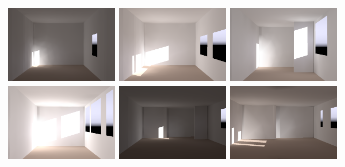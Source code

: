 \documentclass[review]{vgtc}                 %
\begin{document}
\begin{figure}[t]
\includegraphics[width=1.11in]{images/renderings/renovations/065_camera_dark_december_crop.png} %
\includegraphics[width=1.11in]{images/renderings/renovations/065_camera_dark_december_mod_crop.png} %
\hfill
\includegraphics[width=1.11in]{images/renderings/renovations/031_camera_dark_december_crop.png} %
\includegraphics[width=1.11in]{images/renderings/renovations/031_camera_dark_december_mod_crop.png} %
\hfill
\includegraphics[width=1.11in]{images/renderings/renovations/063_camera_dark_december_crop.png} %
\includegraphics[width=1.11in]{images/renderings/renovations/063-2_camera_dark_december_mod_crop.png} %

\vspace{-1.9in}
\begin{minipage}{1.11in}~{\color{white}{\bf A1 original}}\end{minipage} 
\begin{minipage}{1.11in}~{\color{white}{\bf A1 renovation}}\end{minipage}
 \hfill
\begin{minipage}{1.11in}~{\color{white}{\bf A4 original}}\end{minipage} 
\begin{minipage}{1.11in}~{\color{white}{\bf A4 renovation}}\end{minipage} 
\hfill
\begin{minipage}{1.11in}~{\color{white}{\bf N1 original}}\end{minipage} 
\begin{minipage}{1.11in}~{\color{white}{\bf N1 renovation}}\end{minipage}


\end{figure}
\end{document}
